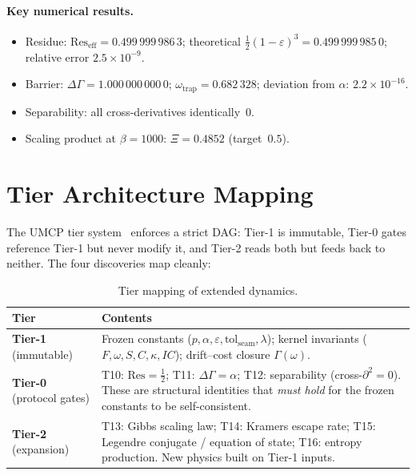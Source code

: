 \documentclass[
  aps,
  prd,
  twocolumn,
  showpacs,
  superscriptaddress,
  nofootinbib,
  floatfix
]{revtex4-2}
\newcommand{\Gam}{\Gamma}
\newcommand{\eps}{\varepsilon}
\newcommand{\tolseam}{\mathrm{tol}_{\mathrm{seam}}}
\newcommand{\Res}{\mathrm{Res}}
\begin{document}
\paragraph{Key numerical results.}
\begin{itemize}
  \item Residue: $\Res_{\mathrm{eff}}=0.499\,999\,986\,3$;
        theoretical $\tfrac{1}{2}(1{-}\eps)^3=0.499\,999\,985\,0$;
        relative error $2.5\times 10^{-9}$.
  \item Barrier: $\Delta\Gam = 1.000\,000\,000\,0$;
        $\omega_{\mathrm{trap}}=0.682\,328$;
        deviation from
        $\alpha$: $2.2\times 10^{-16}$.
  \item Separability: all cross-derivatives identically~$0$.
  \item Scaling product at $\beta=1000$:
        $\Xi=0.4852$ (target~$0.5$).
\end{itemize}

\section{Tier Architecture Mapping}\label{sec:tier}

The UMCP tier system~\cite{paulus2025physicscoherence} enforces
a strict DAG: Tier-1 is immutable, Tier-0 gates reference
Tier-1 but never modify it, and Tier-2 reads both but feeds
back to neither.  The four discoveries map cleanly:

\begin{table}[h]
\caption{\label{tab:tier}Tier mapping of extended dynamics.}
\begin{ruledtabular}
\begin{tabular}{lp{4.8cm}}
\textbf{Tier} & \textbf{Contents} \\
\hline
\textbf{Tier-1} (immutable)
  & Frozen constants ($p,\alpha,\eps,\tolseam,\lambda$);
    kernel invariants ($F,\omega,S,C,\kappa,IC$);
    drift--cost closure $\Gam(\omega)$. \\[4pt]
\textbf{Tier-0} (protocol gates)
  & T10: $\Res=\tfrac{1}{2}$;
    T11: $\Delta\Gam=\alpha$;
    T12: separability (cross-$\partial^2=0$).
    These are structural identities that \emph{must hold}
    for the frozen constants to be self-consistent. \\[4pt]
\textbf{Tier-2} (expansion)
  & T13: Gibbs scaling law;
    T14: Kramers escape rate;
    T15: Legendre conjugate / equation of state;
    T16: entropy production.
    New physics built on Tier-1 inputs. \\
\end{tabular}
\end{ruledtabular}
\end{table}
\end{document}
